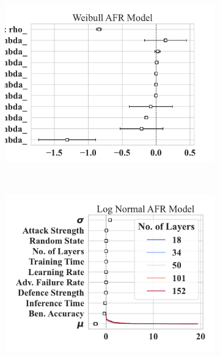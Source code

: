 \begin{figure}[h!]
    \begin{subfigure}[t]{0.3\textwidth}
        \centering
        \includegraphics[width=\textwidth]{mnist/weibull_aft.pdf}
    \end{subfigure}%
    ~ 
    \begin{subfigure}[t]{0.3\textwidth}
        \centering
        \includegraphics[width=\textwidth]{mnist/log_normal_aft.pdf}
    \end{subfigure}
    ~
    \begin{subfigure}[t]{0.3\textwidth}
        \centering

\end{subfigure}
\end{figure}
